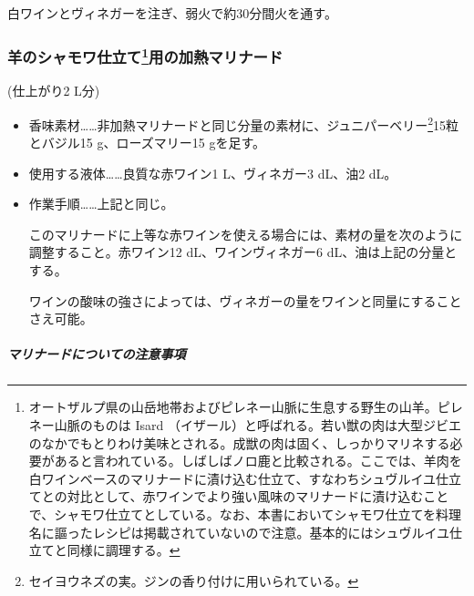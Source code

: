\begin{recette}
\begin{itemize}
  白ワインとヴィネガーを注ぎ、弱火で約30分間火を通す。
\end{itemize}

\hypertarget{marinade-cuite-pour-le-mouton-en-chamois}{%
\subsubsection[羊のシャモワ仕立て用の加熱マリナード]{\texorpdfstring{羊のシャモワ仕立て\footnote{オートザルプ県の山岳地帯およびピレネー山脈に生息する野生の山羊。ピレネー山脈のものは
  Isard
  （イザール）と呼ばれる。若い獣の肉は大型ジビエのなかでもとりわけ美味とされる。成獣の肉は固く、しっかりマリネする必要があると言われている。しばしばノロ鹿と比較される。ここでは、羊肉を白ワインベースのマリナードに漬け込む仕立て、すなわちシュヴルイユ仕立てとの対比として、赤ワインでより強い風味のマリナードに漬け込むことで、シャモワ仕立てとしている。なお、本書においてシャモワ仕立てを料理名に謳ったレシピは掲載されていないので注意。基本的にはシュヴルイユ仕立てと同様に調理する。}用の加熱マリナード}{羊のシャモワ仕立て用の加熱マリナード}}\label{marinade-cuite-pour-le-mouton-en-chamois}}



(仕上がり2 L分)

\begin{itemize}
\item
  香味素材\ldots{}\ldots{}非加熱マリナードと同じ分量の素材に、ジュニパーベリー\footnote{セイヨウネズの実。ジンの香り付けに用いられている。}15粒とバジル15
  g、ローズマリー15 gを足す。
\item
  使用する液体\ldots{}\ldots{}良質な赤ワイン1\undemi{} L、ヴィネガー3
  dL、油2\undemi{} dL。
\item
  作業手順\ldots{}\ldots{}上記と同じ。

  このマリナードに上等な赤ワインを使える場合には、素材の量を次のように調整すること。赤ワイン12
  dL、ワインヴィネガー6 dL、油は上記の分量とする。

  ワインの酸味の強さによっては、ヴィネガーの量をワインと同量にすることさえ可能。
\end{itemize}

\hypertarget{observation-sur-les-marinades}{%
\subparagraph{マリナードについての注意事項}\label{observation-sur-les-marinades}}


\end{recette}
